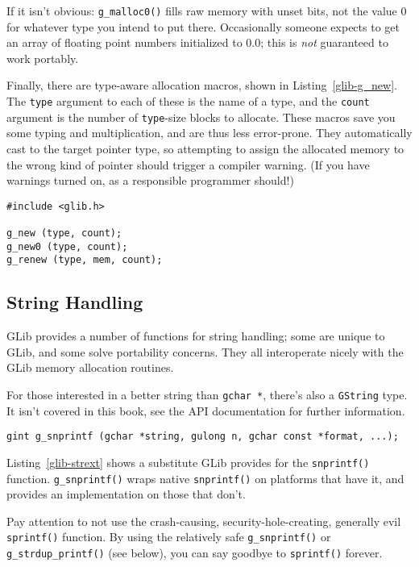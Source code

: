 If it isn't obvious: \lstinline{g_malloc0()} fills raw memory with unset bits, not the value 0 for whatever type you intend to put there. Occasionally someone expects to get an array of floating point numbers initialized to 0.0; this is \emph{not} guaranteed to work portably.

Finally, there are type-aware allocation macros, shown in Listing~\ref{glib-g_new}. The \lstinline{type} argument to each of these is the name of a type, and the \lstinline{count} argument is the number of \lstinline{type}-size blocks to allocate. These macros save you some typing and multiplication, and are thus less error-prone. They automatically cast to the target pointer type, so attempting to assign the allocated memory to the wrong kind of pointer should trigger a compiler warning. (If you have warnings turned on, as a responsible programmer should!)

\begin{lstlisting}[float, caption={Allocation macros}, label=glib-g_new]
#include <glib.h>

g_new (type, count);
g_new0 (type, count);
g_renew (type, mem, count);
\end{lstlisting}

\subsection{String Handling}

GLib provides a number of functions for string handling; some are unique to GLib, and some solve portability concerns. They all interoperate nicely with the GLib memory allocation routines.

For those interested in a better string than \lstinline{gchar *}, there's also a \lstinline{GString} type. It isn't covered in this book, see the API documentation for further information.

\begin{lstlisting}[float, caption={Portability Wrapper}, label=glib-strext]
gint g_snprintf (gchar *string, gulong n, gchar const *format, ...);
\end{lstlisting}

Listing~\ref{glib-strext} shows a substitute GLib provides for the \lstinline{snprintf()} function. \lstinline{g_snprintf()} wraps native \lstinline{snprintf()} on platforms that have it, and provides an implementation on those that don't.

Pay attention to not use the crash-causing, security-hole-creating, generally evil \lstinline{sprintf()} function. By using the relatively safe \lstinline{g_snprintf()} or \lstinline{g_strdup_printf()} (see below), you can say goodbye to \lstinline{sprintf()} forever.

